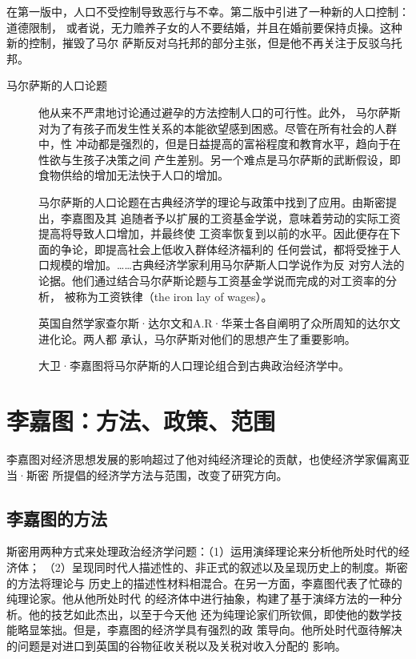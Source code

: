 在第一版中，人口不受控制导致恶行与不幸。第二版中引进了一种新的人口控制：道德限制，
或者说，无力赡养子女的人不要结婚，并且在婚前要保持贞操。这种新的控制，摧毁了马尔
萨斯反对乌托邦的部分主张，但是他不再关注于反驳乌托邦。

\begin{description}
\item[马尔萨斯的人口论题] 他从来不严肃地讨论通过避孕的方法控制人口的可行性。此外，
  马尔萨斯对为了有孩子而发生性关系的本能欲望感到困惑。尽管在所有社会的人群中，性
  冲动都是强烈的，但是日益提高的富裕程度和教育水平，趋向于在性欲与生孩子决策之间
  产生差别。另一个难点是马尔萨斯的武断假设，即食物供给的增加无法快于人口的增加。

  马尔萨斯的人口论题在古典经济学的理论与政策中找到了应用。由斯密提出，李嘉图及其
  追随者予以扩展的工资基金学说，意味着劳动的实际工资提高将导致人口增加，并最终使
  工资率恢复到以前的水平。因此便存在下面的争论，即提高社会上低收入群体经济福利的
  任何尝试，都将受挫于人口规模的增加。……古典经济学家利用马尔萨斯人口学说作为反
  对穷人法的论据。他们通过结合马尔萨斯论题与工资基金学说而完成的对工资率的分析，
  被称为工资铁律（the iron lay of wages）。

  英国自然学家查尔斯·达尔文和A.R·华莱士各自阐明了众所周知的达尔文进化论。两人都
  承认，马尔萨斯对他们的思想产生了重要影响。

  大卫·李嘉图将马尔萨斯的人口理论组合到古典政治经济学中。
\end{description}

\section{李嘉图：方法、政策、范围}

李嘉图对经济思想发展的影响超过了他对纯经济理论的贡献，也使经济学家偏离亚当·斯密
所提倡的经济学方法与范围，改变了研究方向。

\subsection{李嘉图的方法}

斯密用两种方式来处理政治经济学问题：（1）运用演绎理论来分析他所处时代的经济体；
（2）呈现同时代人描述性的、非正式的叙述以及呈现历史上的制度。斯密的方法将理论与
历史上的描述性材料相混合。在另一方面，李嘉图代表了忙碌的纯理论家。他从他所处时代
的经济体中进行抽象，构建了基于演绎方法的一种分析。他的技艺如此杰出，以至于今天他
还为纯理论家们所钦佩，即使他的数学技能略显笨拙。但是，李嘉图的经济学具有强烈的政
策导向。他所处时代亟待解决的问题是对进口到英国的谷物征收关税以及关税对收入分配的
影响。

